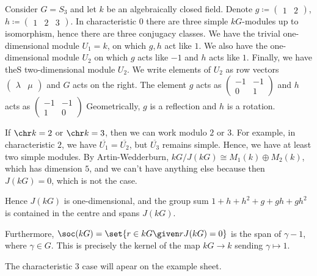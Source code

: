 Consider $G = S_3$ and let $k$ be an algebraically closed field. Denote
$g \coloneqq \begin{pmatrix}1&2\end{pmatrix}$, $h \coloneqq \begin{pmatrix}1&2&3\end{pmatrix}$.
In characteristic $0$ there are three simple $kG$-modules up to isomorphism, hence
there are three conjugacy classes. We have the trivial one-dimensional module
$U_1 = k$, on which $g, h$ act like $1$. We also have the one-dimensional module
$U_2$ on which $g$ acts like $-1$ and $h$ acts like $1$. Finally, we have theS
two-dimensional module $U_2$. We write elements of $U_2$ as row vectors
$\begin{pmatrix}\lambda&\mu\end{pmatrix}$ and $G$ acts on the right.  The element
$g$ acts as $\begin{pmatrix}-1&-1\\0&1\end{pmatrix}$ and $h$ acts as
$\begin{pmatrix}-1&-1\\1&0\end{pmatrix}$ Geometrically, $g$ is a reflection and
$h$ is a rotation.

If $\chr k = 2$ or $\chr k = 3$, then we can work modulo $2$ or $3$. For example,
in characteristic $2$, we have $\overline{U_1} = \overline{U_2}$, but $\overline{U_3}$
remains simple. Hence, we have at least two simple modules. By Artin-Wedderburn,
$kG/J(kG) \cong M_1(k)\oplus M_2(k)$, which has dimension $5$, and we can't have
anything else because then $J(kG) = 0$, which is not the case.

Hence $J(kG)$ is one-dimensional, and the group sum $1 + h + h^2 + g + gh + gh^2$ is
contained in the centre and spans $J(kG)$.

Furthermore, $\soc(kG) = \set{r \in kG\given rJ(kG) = 0}$ is the span of $\gamma  - 1$,
where $\gamma \in G$. This is precisely the kernel of the map $kG\to k$ sending
$\gamma\mapsto 1$.

The characteristic $3$ case will apear on the example sheet.
